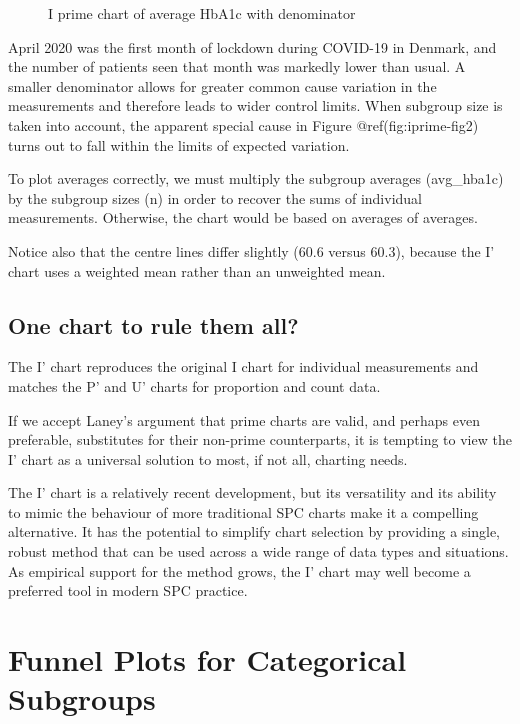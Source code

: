 \documentclass[
]{book}
\makeatletter
\newcommand*\pandocbounded[1]{%
  \sbox\pandoc@box{#1}%
  \Gscale@div\@tempa{\textheight}{\dimexpr\ht\pandoc@box+\dp\pandoc@box\relax}%
  \Gscale@div\@tempb{\linewidth}{\wd\pandoc@box}%
  \ifdim\@tempb\p@<\@tempa\p@\let\@tempa\@tempb\fi%
  \ifdim\@tempa\p@<\p@\scalebox{\@tempa}{\usebox\pandoc@box}%
  \else\usebox{\pandoc@box}%
  \fi%
}
\makeatother
\begin{document}
\begin{figure}
\centering
\pandocbounded{}
\caption{I prime chart of average HbA1c with denominator}
\end{figure}

April 2020 was the first month of lockdown during COVID-19 in Denmark,
and the number of patients seen that month was markedly lower than
usual. A smaller denominator allows for greater common cause variation
in the measurements and therefore leads to wider control limits. When
subgroup size is taken into account, the apparent special cause in
Figure @ref(fig:iprime-fig2) turns out to fall within the limits of
expected variation.

To plot averages correctly, we must multiply the subgroup averages
(avg\_hba1c) by the subgroup sizes (n) in order to recover the sums of
individual measurements. Otherwise, the chart would be based on averages
of averages.

Notice also that the centre lines differ slightly (60.6 versus 60.3),
because the I' chart uses a weighted mean rather than an unweighted
mean.

\section{One chart to rule them all?}\label{one-chart-to-rule-them-all}

The I' chart reproduces the original I chart for individual measurements
and matches the P' and U' charts for proportion and count data.

If we accept Laney's argument that prime charts are valid, and perhaps
even preferable, substitutes for their non-prime counterparts, it is
tempting to view the I' chart as a universal solution to most, if not
all, charting needs.

The I' chart is a relatively recent development, but its versatility and
its ability to mimic the behaviour of more traditional SPC charts make
it a compelling alternative. It has the potential to simplify chart
selection by providing a single, robust method that can be used across a
wide range of data types and situations. As empirical support for the
method grows, the I' chart may well become a preferred tool in modern
SPC practice.

\chapter{Funnel Plots for Categorical
Subgroups}\label{funnel-plots-for-categorical-subgroups}
\end{document}
